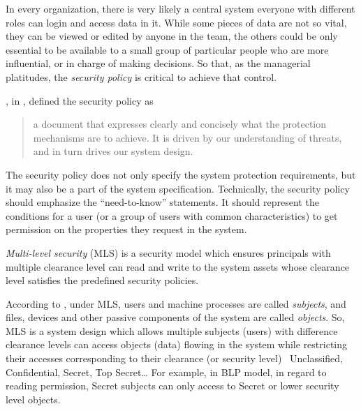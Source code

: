 In every organization, there is very likely a central system everyone with different roles can login and access data in it.
While some pieces of data are not so vital, they can be viewed or edited by anyone in the team, the others could be only essential to be available to a small group of particular people who are more influential, or in charge of making decisions.
So that, as the managerial platitudes, the \emph{security policy} is critical to achieve that control.

\citeauthor{ross:2008}, in \cite{ross:2008}, defined the security policy as
\begin{quote}
a document that expresses clearly and concisely what the protection mechanisms are to achieve. It is driven by our understanding of threats, and in turn drives our system design.
\end{quote} 
The security policy does not only specify the system protection requirements, but it may also be a part of the system specification.
Technically, the security policy should emphasize the ``need-to-know'' statements.
It should represent the conditions for a user (or a group of users with common characteristics) to get permission on the properties they request in the system.

\emph{Multi-level security} (MLS) is a security model which ensures principals with multiple clearance level can read and write to the system assets whose clearance level satisfies the predefined security policies. 

According to \citeauthor{bancinco:2015} \cite{bancinco:2015}, under MLS, users and machine processes are called \emph{subjects}, and files, devices and other passive components of the system are called \emph{objects}.
So, MLS is a system design which allows multiple subjects (users) with difference clearance levels can access objects (data) flowing in the system while restricting their accesses corresponding to their clearance (or security level) \eg\ Unclassified, Confidential, Secret, Top Secret\dots
For example, in BLP model, in regard to reading permission, Secret subjects can only access to Secret or lower security level objects.

